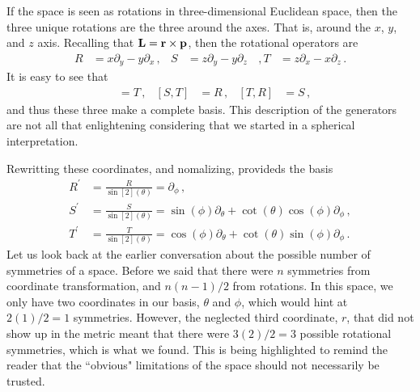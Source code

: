 \documentclass[11pt]{article}
\begin{document}
If the space is seen as rotations in three-dimensional Euclidean space, then the three unique rotations are the three around the axes. That is, around the $x$, $y$, and $z$ axis. Recalling that $\vb{L} = \vb{r}\times \vb{p}$, then the rotational operators are
\begin{align*}
R & = x\partial_y - y\partial_x \, ,& S & = z\partial_y - y\partial_z & \, , T & = z\partial_x - x\partial_z \, .
\end{align*} 
It is easy to see that 
\begin{align*}
[R,S] & = T \, ,& [S, T] & = R \, , & [T, R] & = S \, ,
\end{align*}
and thus these three make a complete basis. This description of the generators are not all that enlightening considering that we started in a spherical interpretation. 

Rewritting these coordinates, and nomalizing, provideds the basis
\begin{align*}
R^\prime & = \frac{R}{\sin[2](\theta)} = \partial_\phi \, ,\\
S^\prime & = \frac{S}{\sin[2](\theta)} = \sin(\phi)\partial_\theta + \cot(\theta)\cos(\phi)\partial_\phi \, ,\\
T^\prime & = \frac{T}{\sin[2](\theta)} = \cos(\phi)\partial_\theta + \cot(\theta)\sin(\phi)\partial_\phi \, .
\end{align*}
Let us look back at the earlier conversation about the possible number of symmetries of a space. Before we said that there were $n$ symmetries from coordinate transformation, and $n(n-1)/2$ from rotations. In this space, we only have two coordinates in our basis, $\theta$ and $\phi$, which would hint at $2(1)/2 =1$ symmetries. However, the neglected third coordinate, $r$, that did not show up in the metric meant that there were $3(2)/2 = 3$ possible rotational symmetries, which is what we found. This is being highlighted to remind the reader that the ``obvious" limitations of the space should not necessarily be trusted.
\end{document}

